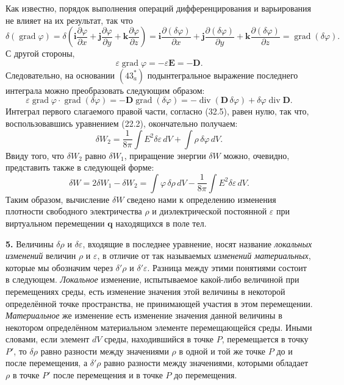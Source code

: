 \documentclass[a4paper,12pt]{article}
\begin{document}
Как известно, порядок выполнения операций дифференцирования и
варьирования не влияет на их результат, так что
$$
    \delta(\operatorname{grad}\varphi)
    = \delta\!\left(\mathbf{i}\frac{\partial\varphi}{\partial x}
                  + \mathbf{j}\frac{\partial\varphi}{\partial y}
                  + \mathbf{k}\frac{\partial\varphi}{\partial z}\right)
    = \mathbf{i}\frac{\partial(\delta\varphi)}{\partial x}
    + \mathbf{j}\frac{\partial(\delta\varphi)}{\partial y}
    + \mathbf{k}\frac{\partial(\delta\varphi)}{\partial z}
    = \operatorname{grad}(\delta\varphi).
$$
С другой стороны,
$$
    \varepsilon\operatorname{grad}\varphi = -\varepsilon\mathbf{E} = -\mathbf{D}.
$$
Следовательно, на основании $(43^*_a)$ подынтегральное выражение
последнего интеграла можно преобразовать следующим образом:
$$
    \varepsilon\operatorname{grad}\varphi\cdot\operatorname{grad}(\delta\varphi)
    = -\mathbf{D}\operatorname{grad}(\delta\varphi)
    = -\operatorname{div}(\mathbf{D}\,\delta\varphi)
    + \delta\varphi\operatorname{div}\mathbf{D}.
$$
Интеграл первого слагаемого правой части, согласно (32.5), равен нулю,
так что, воспользовавшись уравнением (22.2), окончательно получаем:
$$
    \delta W_2 = \frac{1}{8\pi}\int E^2\delta\varepsilon\,dV
               + \int \rho\,\delta\varphi\,dV.
$$
Ввиду того, что $\delta W_2$ равно $\delta W_1$, приращение энергии
$\delta W$ можно, очевидно, представить также в следующей форме:
$$
    \delta W = 2\delta W_1 - \delta W_2
    = \int \varphi\,\delta\rho\,dV
    - \frac{1}{8\pi}\int E^2\delta\varepsilon\,dV.
$$
Таким образом, вычисление $\delta W$ сведено нами к определению изменения
плотности свободного электричества $\rho$ и диэлектрической постоянной
$\varepsilon$ при виртуальном перемещении $\mathbf{q}$ находящихся
в поле тел.

\textbf{5.} Величины $\delta\rho$ и $\delta\varepsilon$, входящие в
последнее уравнение, носят название \textit{локальных изменений} величин
$\rho$ и $\varepsilon$, в отличие от так называемых \textit{изменений
материальных}, которые мы обозначим через $\delta'\rho$ и $\delta'\varepsilon$.
Разница между этими понятиями состоит в следующем. \textit{Локальное}
изменение, испытываемое какой-либо величиной при перемещениях среды,
есть изменение значения этой величины в некоторой определённой точке
пространства, не принимающей участия в этом перемещении.
\textit{Материальное} же изменение есть изменение значения данной
величины в некотором определённом материальном элементе перемещающейся
среды. Иными словами, если элемент $dV$ среды, находившийся в точке $P$,
перемещается в точку $P'$, то $\delta\rho$ равно разности между
значениями $\rho$ в одной и той же точке $P$ до и после перемещения,
а $\delta'\rho$ равно разности между значениями, которыми обладает $\rho$
в точке $P'$ после перемещения и в точке $P$ до перемещения.
\end{document}
